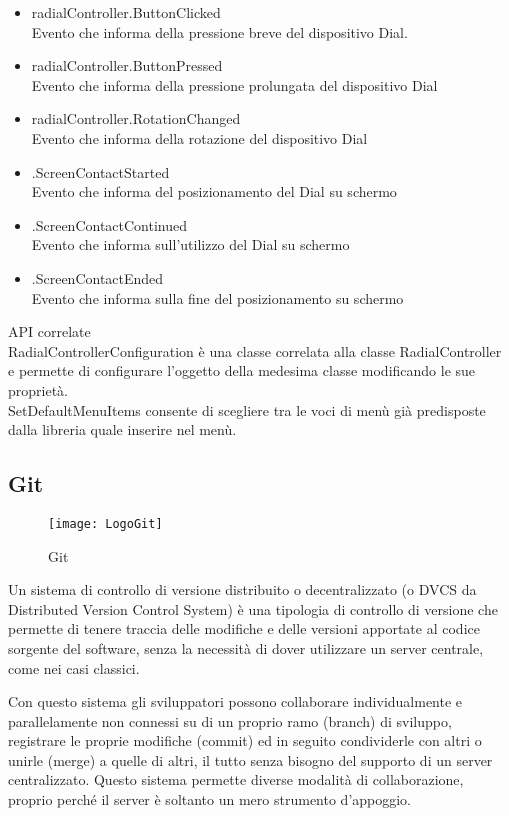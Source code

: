 \begin{itemize}
\item radialController.ButtonClicked\\
Evento che informa della pressione breve del dispositivo Dial.
\item radialController.ButtonPressed\\
Evento che informa della pressione prolungata del dispositivo Dial
\item radialController.RotationChanged\\
Evento che informa della rotazione del dispositivo Dial
\item .ScreenContactStarted\\
Evento che informa del posizionamento del Dial su schermo
\item .ScreenContactContinued\\
Evento che informa sull’utilizzo del Dial su schermo
\item .ScreenContactEnded\\
Evento che informa sulla fine del posizionamento su schermo
\end{itemize}
API correlate\\
RadialControllerConfiguration è una classe correlata alla classe RadialController e permette di configurare l’oggetto della medesima classe modificando le sue proprietà.\\
SetDefaultMenuItems consente di scegliere tra le voci di menù già predisposte dalla libreria quale inserire nel menù.

\newpage
\subsection{Git}
\begin{figure}[htpb!]
\center
  \texttt{[image: LogoGit]}
  \caption{Git}
\end{figure}
Un sistema di controllo di versione distribuito o decentralizzato (o DVCS da Distributed Version Control System) è una tipologia di controllo di versione che permette di tenere traccia delle modifiche e delle versioni apportate al codice sorgente del software, senza la necessità di dover utilizzare un server centrale, come nei casi classici.

Con questo sistema gli sviluppatori possono collaborare individualmente e parallelamente non connessi su di un proprio ramo (branch) di sviluppo, registrare le proprie modifiche (commit) ed in seguito condividerle con altri o unirle (merge) a quelle di altri, il tutto senza bisogno del supporto di un server centralizzato. Questo sistema permette diverse modalità di collaborazione, proprio perché il server è soltanto un mero strumento d'appoggio.
